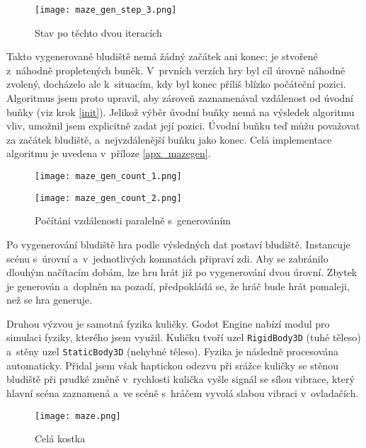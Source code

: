 \begin{figure}[H]
  \centering
  \texttt{[image: maze\_gen\_step\_3.png]}
  \caption{Stav po těchto dvou iteracích}
\end{figure}

Takto vygenerované bludiště nemá žádný začátek ani konec; je stvořené z~náhodně propletených buněk. V~prvních verzích hry byl cíl úrovně náhodně zvolený, docházelo ale k~situacím, kdy byl konec příliš blízko počáteční pozici. Algoritmus jsem proto upravil, aby zároveň zaznamenával vzdálenost od úvodní buňky (viz krok \ref{init}). Jelikož výběr úvodní buňky nemá na výsledek algoritmu vliv, umožnil jsem explicitně zadat její pozici. Úvodní buňku teď můžu považovat za začátek bludiště, a~nejvzdálenější buňku jako konec. Celá implementace algoritmu je uvedena v~příloze \ref{apx_mazegen}.

\begin{figure}[H]
  \centering
  
  \begin{minipage}{.5\textwidth}
    \centering
    \texttt{[image: maze\_gen\_count\_1.png]}
  \end{minipage}%
  \begin{minipage}{.5\textwidth}
    \centering
    \texttt{[image: maze\_gen\_count\_2.png]}
  \end{minipage}
  
  \caption{Počítání vzdálenosti paralelně s~generováním}
\end{figure}

Po vygenerování bludiště hra podle výsledných dat postaví bludiště. Instancuje scénu s~úrovní a~v~jednotlivých komnatách připraví zdi. Aby se zabránilo dlouhým načítacím dobám, lze hru hrát již po vygenerování dvou úrovní. Zbytek je generován a~doplněn na pozadí, předpokládá se, že hráč bude hrát pomaleji, než se hra generuje.

Druhou výzvou je samotná fyzika kuličky. Godot Engine nabízí modul pro simulaci fyziky, kterého jsem využil. Kuličku tvoří uzel \texttt{RigidBody3D} (tuhé těleso) a~stěny uzel \texttt{StaticBody3D} (nehybné těleso). Fyzika je následně procesována automaticky. Přidal jsem však haptickou odezvu při srážce kuličky se stěnou bludiště \poml při prudké změně v~rychlosti kulička vyšle signál se sílou vibrace, který hlavní scéna zaznamená a~ve scéně s~hráčem vyvolá slabou vibraci v~ovladačích.

\begin{figure}[H]
  \centering
  \texttt{[image: maze.png]}
  \caption{Celá kostka}
  \label{maze_fig}
\end{figure}

